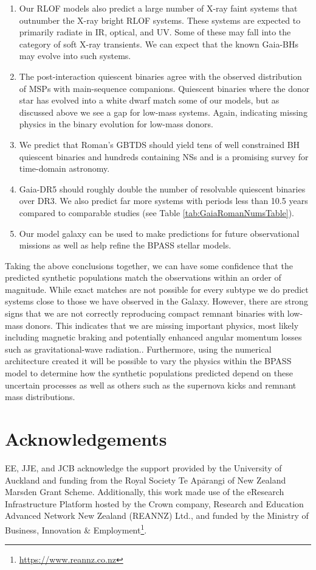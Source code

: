 \documentclass{pas}
\begin{document}
\begin{enumerate}
    \item Our RLOF models also predict a large number of X-ray faint systems that outnumber the X-ray bright RLOF systems. These systems are expected to primarily radiate in IR, optical, and UV. Some of these may fall into the category of soft X-ray transients. We can expect that the known Gaia-BHs may evolve into such systems.
    \item The post-interaction quiescent binaries agree with the observed distribution of MSPs with main-sequence companions. Quiescent binaries where the donor star has evolved into a white dwarf match some of our models, but as discussed above we see a gap for low-mass systems. Again, indicating missing physics in the binary evolution for low-mass donors.
    \item We predict that Roman's GBTDS should yield tens of well constrained BH quiescent binaries and hundreds containing NSs and is a promising survey for time-domain astronomy. 
    \item Gaia-DR5 should roughly double the number of resolvable quiescent binaries over DR3. We also  predict far more systems with periods less than 10.5 years compared to comparable studies (see Table \ref{tab:GaiaRomanNumsTable}). 
    \item Our model galaxy can be used to make predictions for future observational missions as well as help refine the \textsc{BPASS} stellar models. 
\end{enumerate}

Taking the above conclusions together, we can have some confidence that the predicted synthetic populations match the observations within an order of magnitude. While exact matches are not possible for every subtype we do predict systems close to those we have observed in the Galaxy. However, there are strong signs that we are not correctly reproducing compact remnant binaries with low-mass donors. This indicates that we are missing important physics, most likely including magnetic braking and potentially enhanced angular momentum losses such as gravitational-wave radiation.. Furthermore, using the numerical architecture created it will be possible to vary the physics within the \textsc{BPASS} model to determine how the synthetic populations predicted depend on these uncertain processes as well as others such as the supernova kicks and remnant mass distributions.
\section*{Acknowledgements}\label{ack}
EE, JJE, and JCB acknowledge the support provided by the University of Auckland and funding from the Royal Society Te Ap$\bar{\textrm{a}}$rangi of New Zealand Marsden Grant Scheme. Additionally, this work made use of the eResearch Infrastructure Platform hosted by the Crown company, Research and Education Advanced Network New Zealand (REANNZ) Ltd., and funded by the Ministry of Business, Innovation \& Employment\footnote{\url{https://www.reannz.co.nz}}.
\end{document}
